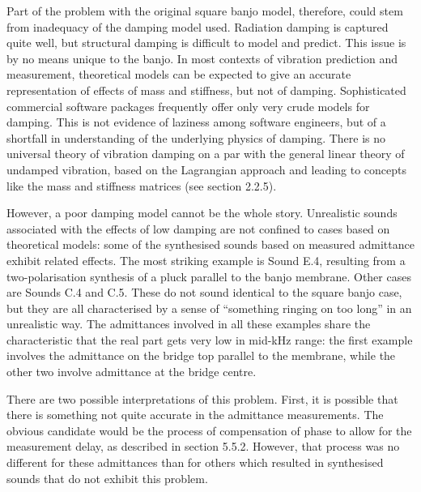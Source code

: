   Part of the problem with the original square banjo model, therefore, could 
  stem from inadequacy of the damping model used. Radiation damping is captured 
  quite well, but structural damping is difficult to model and predict. This 
  issue is by no means unique to the banjo. In most contexts of vibration 
  prediction and measurement, theoretical models can be expected to give an 
  accurate representation of effects of mass and stiffness, but not of damping. 
  Sophisticated commercial software packages frequently offer only very crude 
  models for damping. This is not evidence of laziness among software 
  engineers, but of a shortfall in understanding of the underlying physics of 
  damping. There is no universal theory of vibration damping on a par with the 
  general linear theory of undamped vibration, based on the Lagrangian approach 
  and leading to concepts like the mass and stiffness matrices (see section 
  2.2.5). 

  However, a poor damping model cannot be the whole story. Unrealistic sounds 
  associated with the effects of low damping are not confined to cases based on 
  theoretical models: some of the synthesised sounds based on measured 
  admittance exhibit related effects. The most striking example is Sound E.4, 
  resulting from a two-polarisation synthesis of a pluck parallel to the banjo 
  membrane. Other cases are Sounds C.4 and C.5. These do not sound identical to 
  the square banjo case, but they are all characterised by a sense of 
  ``something ringing on too long'' in an unrealistic way. The admittances 
  involved in all these examples share the characteristic that the real part 
  gets very low in mid-kHz range: the first example involves the admittance on 
  the bridge top parallel to the membrane, while the other two involve 
  admittance at the bridge centre. 

  There are two possible interpretations of this problem. First, it is possible 
  that there is something not quite accurate in the admittance measurements. 
  The obvious candidate would be the process of compensation of phase to allow 
  for the measurement delay, as described in section 5.5.2. However, that 
  process was no different for these admittances than for others which resulted 
  in synthesised sounds that do not exhibit this problem. 

